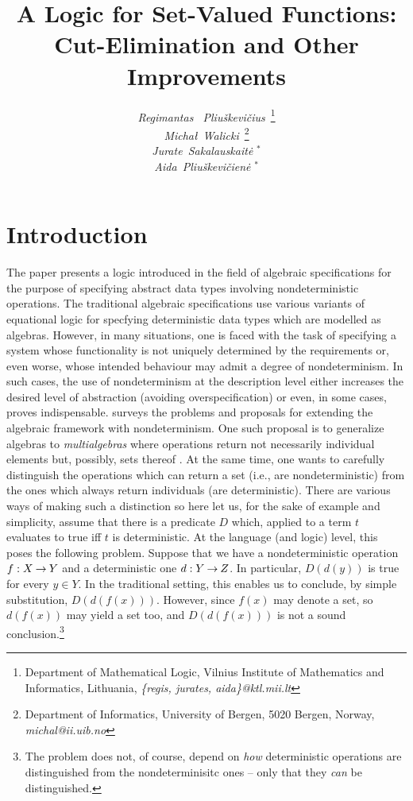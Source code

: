 \documentclass[10pt]{article}
\title{A Logic for Set-Valued Functions:\\ Cut-Elimination and Other Improvements}
\author{ {\em Regimantas ~Pliu\v skevi\v cius}\ \thanks{Department of Mathematical Logic,
Vilnius Institute of Mathematics and Informatics, Lithuania,
{\sl \{regis, jurates, aida\}@ktl.mii.lt}} \\
{\em Micha{\l}~Walicki}\ \thanks{Department of Informatics, University of Bergen, 5020
Bergen, Norway, {\sl michal@ii.uib.no}} \\
{\em Jurate~Sakalauskait\.e }$^*$ \\
{\em Aida~Pliu\v skevi\v cien\.e }$^*$ 
}
\begin{document}
\maketitle
{}

\section{Introduction} %
The paper presents a logic introduced in the field of algebraic specifications
for the purpose of specifying abstract data types involving nondeterministic
operations. The traditional algebraic specifications \cite{EM}
use various variants of equational
logic for specfying deterministic data types which are modelled as algebras.
However, in many situations, one is faced with the task of specifying a system
whose functionality is not uniquely determined by the requirements or, even
worse, whose intended behaviour may admit a degree of nondeterminism. In such cases,
the use of nondeterminism at the description level either increases the desired level
of abstraction (avoiding overspecification) or even, in some cases, proves 
indispensable.  \cite{Surv} surveys the problems and proposals for extending the
algebraic framework with nondeterminism. One such proposal is to generalize
algebras to {\em multialgebras} where operations return not necessarily individual 
elements but, possibly, sets thereof \cite{Hus, Mich, WB}. At the same time, one
wants to carefully distinguish the operations which can return a set (i.e., are
nondeterministic) from the ones which always return individuals (are deterministic).
There are various ways of making such a distinction so here let us, for the sake of
example and simplicity, assume that there is a predicate $D$ which, applied to a
term $t$ evaluates to true iff $t$ is deterministic.
At the language (and logic) level, this poses the following problem. 
Suppose that we have a nondeterministic operation $f:X\mathbin{\rightarrow} Y$ and a deterministic
one $d:Y\mathbin{\rightarrow} Z$. In particular, $D(d(y))$ is true for every $y\in Y$. 
In the traditional
setting, this enables us to conclude, by simple substitution, 
$D(d(f(x)))$. However, since $f(x)$ may denote a set,
so $d(f(x))$ may yield a set too, and $D(d(f(x)))$ is not a sound conclusion.\footnote{The problem does not, of course, depend
on {\em how} deterministic operations are distinguished from the nondeterminisitc ones
-- only that they {\em can} be distinguished.}
\end{document}
